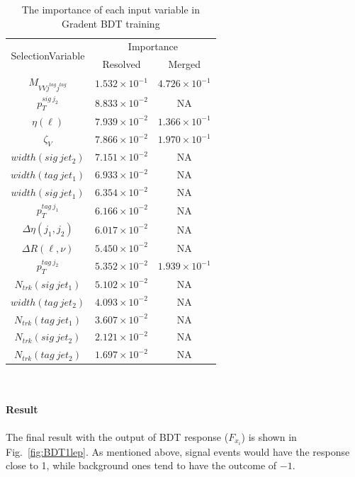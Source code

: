 \begin{table}[h]
	\begin{center}
        \caption{The importance of each input variable in Gradent BDT training}
		\label{Tab:BDTinput1lepranking}
		\begin{tabular}{|c|c|c|} \hline
		    \multirow{2}{*}{SelectionVariable} & \multicolumn{2}{c|}{Importance}  \\
		    \cline{2-3}
                     &Resolved &  Merged  \\\hline
			$M_{VVj^{tag}j^{tag}}$ & $1.532\times10^{-1}$  & $4.726\times10^{-1}$\\\hline
			$p^{sig\ j_{2}}_{T}$ & $8.833\times10^{-2}$ & NA \\\hline
			$\eta(\ell)$ & $7.939\times10^{-2}$ & $1.366\times10^{-1}$ \\\hline
			$\zeta_{V}$ & $7.866\times10^{-2}$ & $1.970\times10^{-1}$ \\\hline
			$width(sig\ jet_{2})$ & $7.151\times10^{-2}$ & NA \\\hline
			$width(tag\ jet_{1})$ & $6.933\times10^{-2}$ & NA \\\hline
			$width(sig\ jet_{1})$ & $6.354\times10^{-2}$ & NA \\\hline
			$p^{tag\ j_{1}}_{T}$ & $6.166\times10^{-2}$  & NA \\\hline
			$\Delta\eta (j_{1}, j_{2})$ & $6.017\times10^{-2}$ & NA\\\hline
			$\Delta R (\ell,\nu)$ & $5.450\times10^{-2}$ & NA\\\hline
			$p^{tag\ j_{2}}_{T}$ & $5.352\times10^{-2}$  & $1.939\times10^{-1}$ \\\hline
			$N_{trk}(sig\ jet_{1})$ & $5.102\times10^{-2}$ & NA \\\hline
			$width(tag\ jet_{2})$ & $4.093\times10^{-2}$ & NA\\\hline
			$N_{trk}(tag\ jet_{1})$ & $3.607\times10^{-2}$ & NA \\\hline
			$N_{trk}(sig\ jet_{2})$ & $2.121\times10^{-2}$ & NA\\\hline
			$N_{trk}(tag\ jet_{2})$ & $1.697\times10^{-2}$ & NA \\\hline
			\hline
		\end{tabular}
	\end{center}
\end{table}
\noindent
\\
\\{\bf Result}
\\
\\The final result with the output of BDT response ($F_{x_i}$) is shown in Fig.~\ref{fig:BDT1lep}. As mentioned above, signal events would have the response close to 1, while background ones tend to have the outcome of $-1$. 


